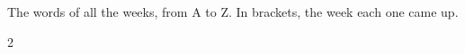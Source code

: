 \section*{\lblDiccionario}

The words of all the weeks, from A to Z. In brackets, the week each one
came up.

\begin{multicols}{2}
\begin{itemize}[leftmargin=0mm, label={}, itemsep=3mm, topsep=0mm]

\end{itemize}
\end{multicols}
\newpage
